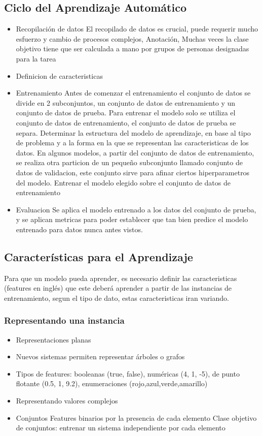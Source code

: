 \documentclass[a4paper,12pt,spanish]{book}
\begin{document}
    \subsection{Ciclo del Aprendizaje Automático}
      \begin{itemize}
	\item Recopilación de datos
	  El recopilado de datos es crucial, puede requerir mucho esfuerzo y cambio de procesos complejos, 
	  Anotación, Muchas veces la clase objetivo tiene que ser calculada a mano por grupos de personas designadas para la tarea
	\item Definicion de caracteristicas
	\item Entrenamiento
	  Antes de comenzar el entrenamiento el conjunto de datos se divide en 2 subconjuntos, un conjunto de datos de entrenamiento y un conjunto de datos de prueba. 
	  Para entrenar el modelo solo se utiliza el conjunto de datos de entrenamiento, el conjunto de datos de prueba se separa.
	  Determinar la estructura del modelo de aprendizaje, en base al tipo de problema y a la forma en la que se representan las caracteristicas de los datos.
	  En algunos modelos, a partir del conjunto de datos de entrenamiento, se realiza otra particion de un pequeño subconjunto llamado conjunto de datos de validacion, este conjunto sirve 
	  para afinar ciertos hiperparametros del modelo.
	  Entrenar el modelo elegido sobre el conjunto de datos de entrenamiento
	\item Evaluacion
	  Se aplica el modelo entrenado a los datos del conjunto de prueba, y se aplican metricas para poder establecer que tan bien predice el modelo entrenado para datos nunca antes vistos.
    \end{itemize}


    \subsection{Características para el Aprendizaje}
      Para que un modelo pueda aprender, es necesario definir las caracteristicas (features en inglés) que este deberá aprender a partir de las instancias de entrenamiento, segun el tipo de dato, estas
      caracteristicas iran variando.
      \subsubsection{Representando una instancia}
	\begin{itemize}
	  \item Representaciones planas
	  \item Nuevos sistemas permiten representar árboles o grafos
	  \item Tipos de features: booleanas (true, false), numéricas (4, 1, -5), de punto flotante (0.5, 1, 9.2), enumeraciones (rojo,azul,verde,amarillo)
	  \item Representando valores complejos
	  \item Conjuntos
	    \subitem Features binarios por la presencia de cada elemento
	    \subitem Clase objetivo de conjuntos: entrenar un sistema independiente por cada elemento
	\end{itemize}
\end{document}
